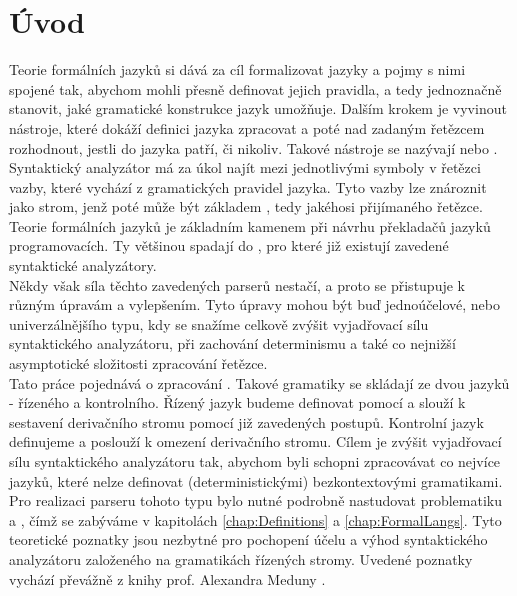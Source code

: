 
\chapter{Úvod}

Teorie formálních jazyků si dává za cíl formalizovat jazyky a pojmy s nimi
spojené tak, abychom mohli přesně definovat jejich pravidla, a tedy
jednoznačně stanovit, jaké gramatické konstrukce jazyk umožňuje.
Dalším krokem je vyvinout nástroje, které
dokáží definici jazyka zpracovat a poté nad zadaným řetězcem rozhodnout, jestli
do jazyka patří, či nikoliv. Takové nástroje se nazývají
 nebo .\\

Syntaktický analyzátor má za úkol najít mezi jednotlivými symboly
v řetězci vazby, které vychází z gramatických pravidel jazyka. Tyto vazby lze
znároznit jako strom, jenž poté může být základem ,
tedy jakéhosi  přijímaného řetězce.
Teorie formálních jazyků je základním kamenem při návrhu překladačů
jazyků programovacích. Ty většinou spadají do ,
pro které již existují zavedené syntaktické analyzátory.\\

Někdy však síla těchto zavedených parserů nestačí, a proto se přistupuje
k různým úpravám a vylepšením.
Tyto úpravy mohou být buď jednoúčelové, nebo univerzálnějšího typu, kdy
se snažíme celkově zvýšit vyjadřovací sílu syntaktického analyzátoru,
při zachování determinismu a také co nejnižší asymptotické složitosti
zpracování řetězce.\\

Tato práce pojednává o zpracování .
Takové gramatiky se skládají ze dvou jazyků - řízeného a kontrolního.
Řízený jazyk budeme definovat pomocí  a
slouží k sestavení derivačního stromu pomocí již zavedených postupů.
Kontrolní jazyk definujeme  a poslouží k
omezení derivačního stromu. Cílem je zvýšit vyjadřovací sílu
syntaktického analyzátoru tak, abychom byli schopni zpracovávat co
nejvíce jazyků, které nelze definovat (deterministickými) bezkontextovými
gramatikami.\\

Pro realizaci parseru tohoto typu bylo nutné podrobně nastudovat problematiku
 a , čímž se zabýváme
v kapitolách \ref{chap:Definitions} a \ref{chap:FormalLangs}.
Tyto teoretické poznatky jsou nezbytné pro pochopení účelu a výhod
syntaktického analyzátoru založeného na gramatikách řízených stromy. Uvedené
poznatky vychází převážně z knihy prof. Alexandra Meduny \cite{MedunaIFJ}.\\

